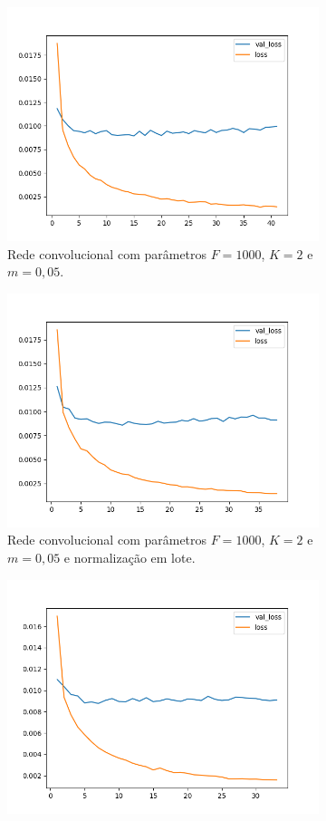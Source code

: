 \begin{figure}[H]
\begin{subfigure}{.5\textwidth}
  \centering
  \includegraphics[width=.8\linewidth]{figuras/ape-ajustes-hiper-parametros/cnn-1000-k-2-m-005.png}
  \caption{Rede convolucional com parâmetros $F = 1000$, $K = 2$ e $m = 0,05$.}
  \label{fig:cnn-1000-k-2-m-005}
\end{subfigure}
\begin{subfigure}{.5\textwidth}
  \centering
  \includegraphics[width=.8\linewidth]{figuras/ape-ajustes-hiper-parametros/cnn-with-bn-1000-k-2-m-005.png}
  \caption{Rede convolucional com parâmetros $F = 1000$, $K = 2$ e $m = 0,05$ e normalização em lote.}
  \label{fig:cnn-1000-k-2-m-005-normalizacao-em-lote}
\end{subfigure}
\begin{subfigure}{.5\textwidth}
  \centering
  \includegraphics[width=.8\linewidth]{figuras/ape-ajustes-hiper-parametros/cnn-2000-k-2-m-005.png}

\end{subfigure}
\end{figure}
